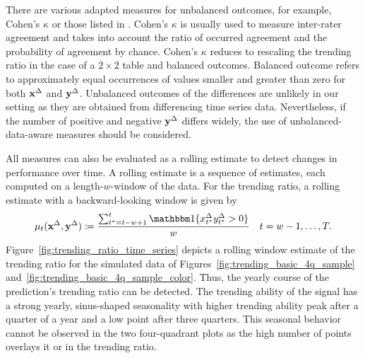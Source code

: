 There are various adapted measures for unbalanced outcomes, for example, Cohen's $\kappa$ \parencite{Cohen1960} or those listed in \textcite[Table 3.3]{Jolliffe2012}.
Cohen's $\kappa$ is usually used to measure inter-rater agreement and takes into account the ratio of occurred agreement and the probability of agreement by chance.
Cohen's $\kappa$ reduces to rescaling the trending ratio in the case of a $2\times2$ table and balanced outcomes.
Balanced outcome refers to approximately equal occurrences of values smaller and greater than zero for both $\mathbf{x}^{\Delta}$ and $\mathbf{y}^{\Delta}$.
Unbalanced outcomes of the differences are unlikely in our setting as they are obtained from differencing time series data.
Nevertheless, if the number of positive and negative $\mathbf{y}^{\Delta}$ differs widely, the use of unbalanced-data-aware measures should be considered.

All measures can also be evaluated as a rolling estimate to detect changes in performance over time.
A rolling estimate is a sequence of estimates, each computed on a length-$w$-window of the data.
For the trending ratio, a rolling estimate with a backward-looking window is given by
\begin{equation*}
    \acc_t (\diffx, \diffy) \coloneqq \frac{\sum_{t^* = t-w + 1}^{t} \ind{\diffxt[t^*] \diffyt[t^*] > 0}}{w} \quad t = w-1, \dots, T.\label{eq:acc_rolling}
\end{equation*}
Figure~\ref{fig:trending_ratio_time_series} depicts a rolling window estimate of the trending ratio for the simulated data of Figures~\ref{fig:trending_basic_4q_sample} and~\ref{fig:trending_basic_4q_sample_color}.
Thus, the yearly course of the prediction's trending ratio can be detected.
The trending ability of the signal has a strong yearly, sinus-shaped seasonality with higher trending ability peak after a quarter of a year and a low point after three quarters.
This seasonal behavior cannot be observed in the two four-quadrant plots as the high number of points overlays it or in the trending ratio.

